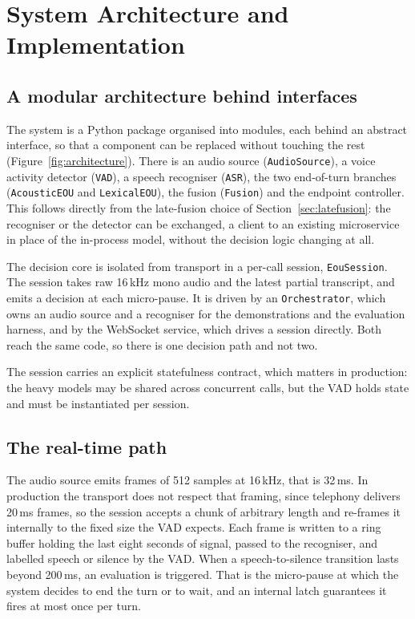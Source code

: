 \chapter{System Architecture and Implementation}
\label{ch:implementation}

\section{A modular architecture behind interfaces}
\label{sec:architecture}

The system is a Python package organised into modules, each behind an abstract interface,
so that a component can be replaced without touching the rest
(Figure~\ref{fig:architecture}). There is an audio source
(\texttt{AudioSource}), a voice activity detector (\texttt{VAD}), a speech recogniser
(\texttt{ASR}), the two end-of-turn branches (\texttt{AcousticEOU} and
\texttt{LexicalEOU}), the fusion (\texttt{Fusion}) and the endpoint controller. This
follows directly from the late-fusion choice of Section~\ref{sec:latefusion}: the
recogniser or the detector can be exchanged, a client to an existing microservice in place
of the in-process model, without the decision logic changing at all.

The decision core is isolated from transport in a per-call session,
\texttt{EouSession}. The session takes raw 16\,kHz mono audio and the latest partial
transcript, and emits a decision at each micro-pause. It is driven by an \texttt{Orchestrator}, which owns an audio source and a recogniser for
the demonstrations and the evaluation harness, and by the WebSocket service, which drives a
session directly.
Both reach the same code, so there is one decision path and not two.

The session carries an explicit statefulness contract, which matters in production:
the heavy models may be shared across concurrent calls, but the VAD holds state and must be
instantiated per session.

\section{The real-time path}
\label{sec:realtime}

The audio source emits frames of 512 samples at 16\,kHz, that is 32\,ms. In production the
transport does not respect that framing, since telephony delivers 20\,ms frames, so the
session accepts a chunk of arbitrary length and re-frames it internally to the fixed size
the VAD expects. Each frame is written to a ring buffer holding the last eight seconds of
signal, passed to the recogniser, and labelled speech or silence by the VAD. When a
speech-to-silence transition lasts beyond 200\,ms, an evaluation is triggered. That is the
micro-pause at which the system decides to end the turn or to wait, and an internal latch
guarantees it fires at most once per turn.

